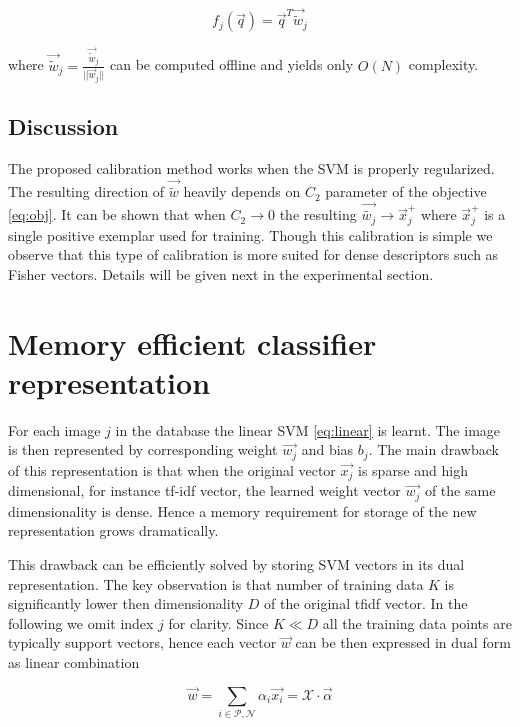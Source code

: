       \begin{equation}
         f_j(\vec{q}) = \vec{q}^T\vec{\tilde{w}}_j
         \label{eq:rescale}
      \end{equation}

      \noindent
      where $\vec{\tilde{w}}_j=\frac{\vec{\tilde{w}}_j}{||\vec{w}_j||}$ can be computed offline and yields only $O(N)$ complexity.
   \subsection{Discussion}
      The proposed calibration method works when the SVM is properly regularized. The resulting direction of $\vec{\tilde{w}}$ heavily depends on $C_2$ parameter of the objective \eqref{eq:obj}. It can be shown that when $C_2 \rightarrow 0$ the resulting $\vec{\tilde{w_j}} \rightarrow \vec{x}_j^+$ where $\vec{x}_j^+$ is a single positive exemplar used for training. Though this calibration is simple we observe that this type of calibration is more suited for dense descriptors such as Fisher vectors. Details will be given next in the experimental section. 




  \section{Memory efficient classifier representation}
      For each image $j$ in the database the linear SVM \eqref{eq:linear} is learnt. The image is then represented by corresponding weight $\vec{w_j}$ and bias $b_j$. The main drawback of this representation is that when the original vector $\vec{x_j}$ is sparse and high dimensional, for instance tf-idf vector, the learned weight vector $\vec{w_j}$ of the same dimensionality is dense. Hence a memory requirement for storage of the new representation grows dramatically.

      This drawback can be efficiently solved by storing SVM vectors in its dual representation. The key observation is that number of training data $K$ is significantly lower then dimensionality $D$ of the original tfidf vector. In the following we omit index $j$ for clarity. Since $K\ll D$ all the training data points are typically support vectors, hence each vector $\vec{w}$ can be then expressed in dual form as linear combination

      \begin{equation}
        \vec{w}=\sum_{i\in \mathcal{P},\mathcal{N}} \alpha_i \vec{x_i} = \mathcal{X} \cdot \vec{\alpha}
        \label{eq:dual}
      \end{equation}

